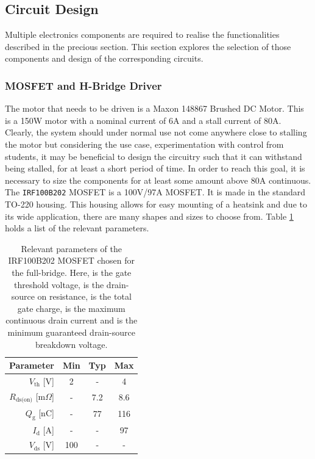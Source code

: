 \subsection{Circuit Design}
\label{sub:controller_board_circuit_design}

Multiple electronics components are required to realise the functionalities described in the precious section.
This section explores the selection of those components and design of the corresponding circuits.

\subsubsection{MOSFET and H-Bridge Driver} %
\label{ssub:h_bridge}
The motor that needs to be driven is a Maxon 148867 Brushed DC Motor.
This is a 150W motor with a nominal current of 6A and a stall current of 80A.
Clearly, the system should under normal use not come anywhere close to stalling the motor but considering the use case, experimentation with control from students, it may be beneficial to design the circuitry such that it can withstand being stalled, for at least a short period of time.
In order to reach this goal, it is necessary to size the components for at least some amount above 80A continuous.
The \texttt{IRF100B202} MOSFET \cite{mosfet} is a 100V/97A MOSFET.
It is made in the standard TO-220 housing.
This housing allows for easy mounting of a heatsink and due to its wide application, there are many shapes and sizes to choose from.
Table \ref{tab:mosfetparameters} holds a list of the relevant parameters.

\begin{table}[tb]
	\centering
	\begin{tabular}{|r|c|c|c|}
	\hline
		\textbf{Parameter} & \textbf{Min} & \textbf{Typ} & \textbf{Max} \\
	\hline
		$V_{\text{th}}$ [V] & 2 & - & 4 \\
	\hline
		$R_{\text{ds(on)}}$ [m$\Omega$]& - & 7.2 & 8.6 \\
	\hline
		$Q_\text{g}$ [nC] & - & 77 & 116 \\
	\hline
		$I_\text{d}$ [A] & - & - & 97 \\
	\hline
		$V_{\text{ds}}$ [V] & 100 & - & - \\
	\hline
	\end{tabular}
	\caption{Relevant parameters of the IRF100B202 MOSFET \cite{mosfet} chosen for the full-bridge.
	Here, \vth is the gate threshold voltage, \ron is the drain-source on resistance, \qg is the total gate charge, \id is the maximum continuous drain current and \vds is the minimum guaranteed drain-source breakdown voltage.}
	\label{tab:mosfetparameters}
\end{table}


